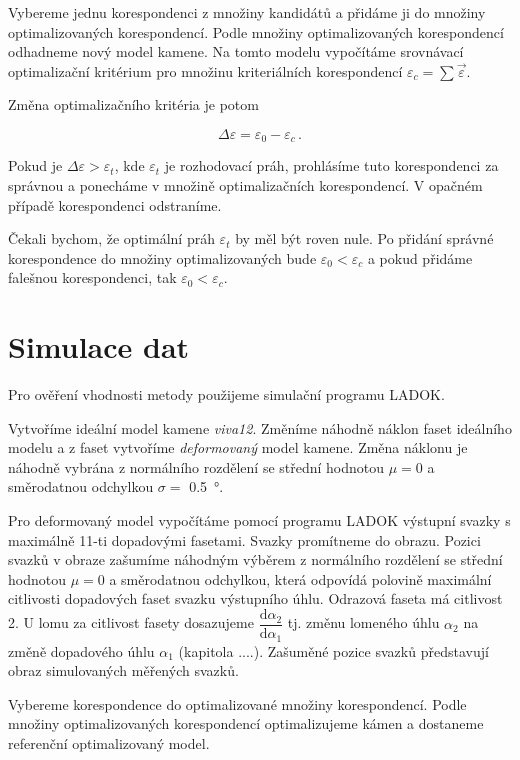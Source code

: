 	Vybereme jednu korespondenci z množiny kandidátů a přidáme ji do množiny optimalizovaných korespondencí. Podle množiny optimalizovaných korespondencí odhadneme nový model kamene. Na tomto modelu  vypočítáme srovnávací optimalizační kritérium pro množinu kriteriálních korespondencí $\varepsilon_c = \sum\vec{\varepsilon}$. 
	
	Změna optimalizačního kritéria je potom 
	
	\begin{equation}
	\Delta\varepsilon  = \varepsilon_0 - \varepsilon_c\,.
	\end{equation}
	
	Pokud je $\Delta\varepsilon  > \varepsilon_t$, kde $\varepsilon_t$ je rozhodovací práh, prohlásíme tuto korespondenci za správnou a ponecháme v množině optimalizačních korespondencí. V opačném případě korespondenci odstraníme.
	
	Čekali bychom, že optimální práh $\varepsilon_t$ by měl být roven nule. Po přidání správné korespondence do množiny optimalizovaných bude  $\varepsilon_0 < \varepsilon_c$ a pokud přidáme falešnou korespondenci, tak $\varepsilon_0 < \varepsilon_c$. 

\section{Simulace dat}
\label{sec: sber dat}
	Pro ověření vhodnosti metody použijeme simulační programu LADOK. 	
	
	Vytvoříme ideální model kamene \textit{viva12}. Změníme náhodně náklon faset ideálního modelu a z faset vytvoříme \textit{deformovaný} model kamene. Změna náklonu je náhodně vybrána z normálního rozdělení se střední hodnotou $\mu = 0$ a směrodatnou odchylkou $\sigma = $ \SI{0.5}{\degree}. 
	
	 Pro deformovaný model vypočítáme pomocí programu LADOK výstupní svazky s maximálně 11-ti dopadovými fasetami. Svazky promítneme do obrazu. Pozici svazků v obraze zašumíme náhodným výběrem z normálního rozdělení se střední hodnotou $\mu = 0$ a směrodatnou odchylkou, která odpovídá polovině maximální citlivosti dopadových faset svazku výstupního úhlu. Odrazová faseta má citlivost 2. U lomu za citlivost fasety dosazujeme $\dfrac{\mathrm{d}\alpha_2}{\mathrm{d}\alpha_1}$ tj. změnu lomeného úhlu $\alpha_2$ na změně dopadového úhlu $\alpha_1$ (kapitola ....). Zašuměné pozice svazků představují obraz simulovaných měřených svazků.  
	 
	Vybereme korespondence do optimalizované množiny korespondencí. Podle množiny optimalizovaných korespondencí optimalizujeme kámen a dostaneme referenční optimalizovaný model. 
	
